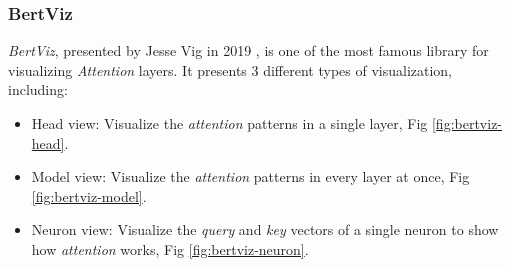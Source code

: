 \subsubsection{BertViz}
\label{sec:Bertviz}
\noindent \emph{BertViz}, presented by Jesse Vig in 2019 \cite{Vig2019}, is one of the most famous library for visualizing \emph{Attention}  layers. It presents 3 different types of visualization, including:
\begin{itemize}
	\item Head view: Visualize the \emph{attention} patterns in a single layer, Fig \ref{fig:bertviz-head}.
	\item Model view: Visualize the \emph{attention} patterns in every layer at once, Fig \ref{fig:bertviz-model}.
	\item Neuron view: Visualize the \emph{query} and \emph{key} vectors of a single neuron to show how \emph{attention} works, Fig \ref{fig:bertviz-neuron}.
\end{itemize}
